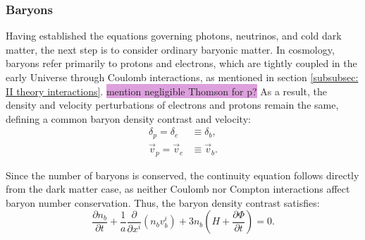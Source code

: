 \documentclass{aa}
\numberwithin{equation}{section}
\numberwithin{table}{section}
\numberwithin{figure}{section}
\begin{document}
\subsubsection{Baryons}
Having established the equations governing photons, neutrinos, and cold dark matter, the next step is to consider ordinary baryonic matter. In cosmology, baryons refer primarily to protons and electrons, which are tightly coupled in the early Universe through Coulomb interactions, as mentioned in section \ref{subsubsec: II theory interactions}. \colorbox{Plum}{mention negligible Thomson for p?}
As a result, the density and velocity perturbations of electrons and protons remain the same, defining a common baryon density contrast and velocity:
\begin{align}
    \delta_p = \delta_e &\equiv \delta_b, \\
    \vec{v}_p = \vec{v}_e &\equiv \vec{v}_b.
\end{align}

Since the number of baryons is conserved, the continuity equation follows directly from the dark matter case, as neither Coulomb nor Compton interactions affect baryon number conservation. Thus, the baryon density contrast satisfies:
\begin{equation}
    \frac{\partial n_b}{\partial t} + \frac{1}{a} \frac{\partial}{\partial x^i} \left(n_b v_b^i\right) + 3n_b \left( H + \frac{\partial \Phi}{\partial t} \right) = 0.
\end{equation}
\end{document}
